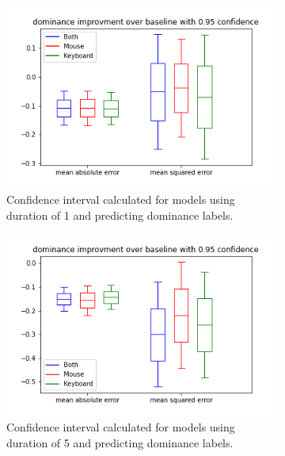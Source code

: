 \begin{figure}[!h]
    \begin{subfigure}[b]{0.31\textwidth}
        \centering
        \includegraphics[width=\textwidth]{figures/results/interval_difference/1/1_dominance_0.95.png}
        \captionsetup{justification=centering}
        \caption{Confidence interval calculated for models using duration of 1 and predicting dominance labels.}
    \end{subfigure}
    \hfill
    \begin{subfigure}[b]{0.31\textwidth}
        \centering
        \includegraphics[width=\textwidth]{figures/results/interval_difference/5/5_dominance_0.95.png}
        \captionsetup{justification=centering}
        \caption{Confidence interval calculated for models using duration of 5 and predicting dominance labels.}
    \end{subfigure}
    \begin{subfigure}[b]{0.31\textwidth}

\end{subfigure}
\end{figure}
